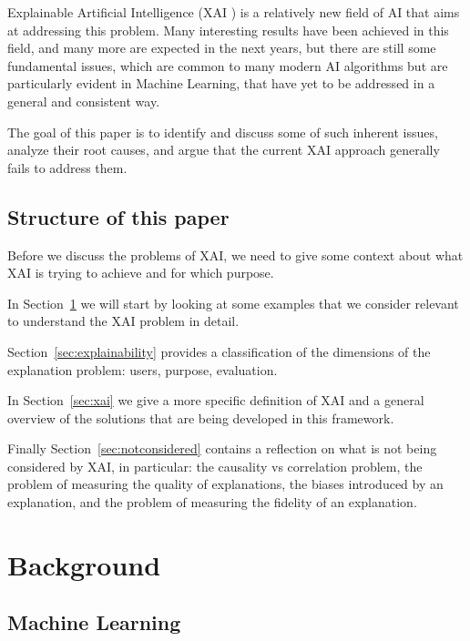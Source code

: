 \documentclass[conference]{IEEEtran}
\newcommand{\cit}{\todo[tickmarkheight=0.2cm]{cit}}
\begin{document}
Explainable Artificial Intelligence (XAI \cit) is a relatively new field of AI that aims at addressing this
problem. Many interesting results have been achieved in this field, and many
more are expected in the next years, but there are still some fundamental
issues, which are common to many modern AI algorithms but are particularly
evident in Machine Learning, that have yet to be addressed in a general and
consistent way.

The goal of this paper is to identify and discuss some of such inherent issues,
analyze their root causes, and argue that the current XAI approach
generally fails to address them.

\subsection{Structure of this paper}
\label{sec:structure}

Before we discuss the problems of XAI, we need to give some context about what
XAI is trying to achieve and for which purpose.

In Section~\ref{sec:problem} we will start by looking at some examples  that we consider relevant to understand the XAI problem in detail.

Section~\ref{sec:explainability} provides a classification of the dimensions of the explanation problem: users, purpose, evaluation.

In Section~\ref{sec:xai} we give a more specific definition of XAI and a general
overview of the solutions that are being developed in this framework.

Finally Section~\ref{sec:notconsidered} contains a reflection on what is not
being considered by XAI, in particular: the causality vs correlation problem,
the problem of measuring the quality of explanations, the biases introduced by
an explanation, and the problem of measuring the fidelity of an explanation.


\section{Background}
\label{sec:problem}

\subsection{Machine Learning}
\label{sec:ml}
\end{document}
